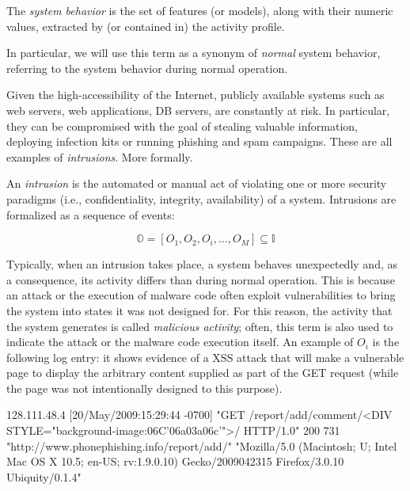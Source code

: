\begin{definition}\label{def:system-behavior}
  The \emph{system behavior} is the set of features (or models), along
  with their numeric values, extracted by (or contained in) the
  activity profile.
\end{definition}

In particular, we will use this term as a synonym of \emph{normal}
system behavior, referring to the system behavior during normal
operation.

Given the high-accessibility of the Internet, publicly available
systems such as web servers, web applications, \ac{DB}
servers, are constantly at risk. In particular, they can be
compromised with the goal of stealing valuable information, deploying
infection kits or running phishing and spam
campaigns. These are all examples of \emph{intrusions}. More formally.

\begin{definition}[Intrusion]
  An \emph{intrusion} is the automated or manual act of violating one
  or more security paradigms (i.e., confidentiality, integrity,
  availability) of a system. Intrusions are formalized as a sequence
  of events:

  \begin{displaymath}
    \mathbb{O} = [O_{1}, O_{2}, O_{i}, \dots, O_{M}] \subseteq
    \mathbb{I}
  \end{displaymath}
\end{definition}

\noindent Typically, when an intrusion takes place, a system behaves
unexpectedly and, as a consequence, its activity differs than during
normal operation. This is because an attack or the execution of
malware code often exploit vulnerabilities to bring the system into
states it was not designed for. For this reason, the activity that the
system generates is called \emph{malicious activity}; often, this term
is also used to indicate the attack or the malware code execution
itself. An example of $O_{i}$ is the following log entry: it shows
evidence of a \ac{XSS} attack that will make a vulnerable page to
display the arbitrary content supplied as part of the GET request
(while the page was not intentionally designed to this purpose).

\begin{logs} 128.111.48.4 [20/May/2009:15:29:44 -0700] "GET
/report/add/comment/<DIV
STYLE="background-image:\006C'\006a\003a\006c'">/
HTTP/1.0" 200 731 "http://www.phonephishing.info/report/add/"
"Mozilla/5.0 (Macintosh; U; Intel Mac OS X 10.5; en-US; rv:1.9.0.10)
Gecko/2009042315 Firefox/3.0.10 Ubiquity/0.1.4"
\end{logs}

